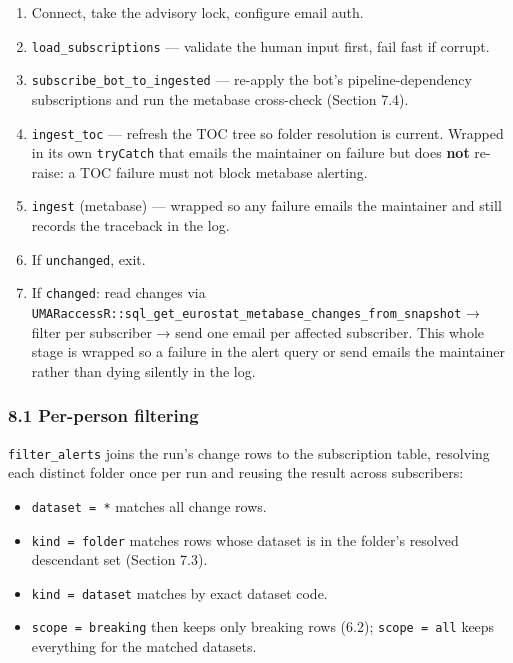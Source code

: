 \documentclass[
]{article}
\providecommand{\tightlist}{%
  \setlength{\itemsep}{0pt}\setlength{\parskip}{0pt}}
\begin{document}
\begin{enumerate}
\def\labelenumi{\arabic{enumi}.}
\tightlist
\item
  Connect, take the advisory lock, configure email auth.
\item
  \texttt{load\_subscriptions} --- validate the human input first, fail
  fast if corrupt.
\item
  \texttt{subscribe\_bot\_to\_ingested} --- re-apply the bot's
  pipeline-dependency subscriptions and run the metabase cross-check
  (Section 7.4).
\item
  \texttt{ingest\_toc} --- refresh the TOC tree so folder resolution is
  current. Wrapped in its own \texttt{tryCatch} that emails the
  maintainer on failure but does \textbf{not} re-raise: a TOC failure
  must not block metabase alerting.
\item
  \texttt{ingest} (metabase) --- wrapped so any failure emails the
  maintainer and still records the traceback in the log.
\item
  If \texttt{unchanged}, exit.
\item
  If \texttt{changed}: read changes via
  \texttt{UMARaccessR::sql\_get\_eurostat\_metabase\_changes\_from\_snapshot}
  → filter per subscriber → send one email per affected subscriber. This
  whole stage is wrapped so a failure in the alert query or send emails
  the maintainer rather than dying silently in the log.
\end{enumerate}

\subsubsection{8.1 Per-person filtering}\label{per-person-filtering}

\texttt{filter\_alerts} joins the run's change rows to the subscription
table, resolving each distinct folder once per run and reusing the
result across subscribers:

\begin{itemize}
\tightlist
\item
  \texttt{dataset\ =\ \textquotesingle{}*\textquotesingle{}} matches all
  change rows.
\item
  \texttt{kind\ =\ \textquotesingle{}folder\textquotesingle{}} matches
  rows whose dataset is in the folder's resolved descendant set (Section
  7.3).
\item
  \texttt{kind\ =\ \textquotesingle{}dataset\textquotesingle{}} matches
  by exact dataset code.
\item
  \texttt{scope\ =\ \textquotesingle{}breaking\textquotesingle{}} then
  keeps only breaking rows (6.2);
  \texttt{scope\ =\ \textquotesingle{}all\textquotesingle{}} keeps
  everything for the matched datasets.
\end{itemize}
\end{document}
